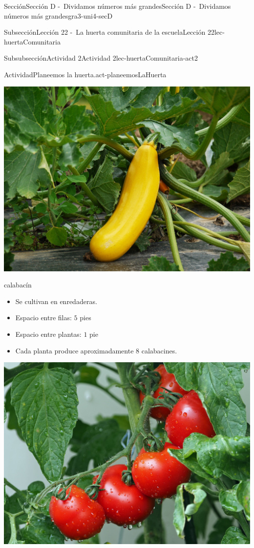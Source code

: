 \documentclass[twoside,10pt,]{article}
\begin{document}
\begin{sectionptx}{Sección}{Sección D -~Dividamos números más grandes}{}{Sección D -~Dividamos números más grandes}{}{}{gra3-uni4-secD}
\begin{subsectionptx}{Subsección}{Lección 22 -~La huerta comunitaria de la escuela}{}{Lección 22}{}{}{lec-huertaComunitaria}
\begin{subsubsectionptx}{Subsubsección}{Actividad 2}{}{Actividad 2}{}{}{lec-huertaComunitaria-act2}
\begin{activity}{Actividad}{Planeemos la huerta.}{act-planeemosLaHuerta}
\begin{sidebyside}{2}{0.025}{0.025}{0.05}
\begin{sbspanel}{0.45}
\includegraphics[width=\linewidth]{external/jpg-source/3-4-D-22 Act2-calabacin.jpg}
%
\par
calabacín%
%
\begin{itemize}[label=\textbullet]
\item{}Se cultivan en enredaderas.%
\item{}Espacio entre filas: \(5\) pies%
\item{}Espacio entre plantas: \(1\) pie%
\item{}Cada planta produce aproximadamente \(8\) calabacines.%
\end{itemize}
\end{sbspanel}%
\begin{sbspanel}{0.45}%
\includegraphics[width=\linewidth]{external/jpg-source/3-4-D-22 Act2-tomate.jpg}

\end{sbspanel}
\end{sidebyside}
\end{activity}
\end{subsubsectionptx}
\end{subsectionptx}
\end{sectionptx}
\end{document}
